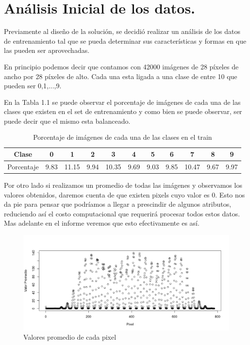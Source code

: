 \chapter{Análisis Inicial de los datos.}
Previamente al diseño de la solución, se decidió realizar un análisis de los datos de entrenamiento tal que se pueda determinar sus características y formas en que las pueden ser aprovechadas.

En principio podemos decir que contamos con 42000 imágenes de 28 píxeles de ancho por 28 píxeles de alto. Cada una esta ligada a una clase de entre 10 que pueden ser 0,1,...,9. 

En la Tabla 1.1 se puede observar el porcentaje de imágenes de cada una de las clases que existen en el set de entrenamiento y como bien se puede observar, ser puede decir que el mismo esta balanceado. 

\begin{table}[htp]
  \caption{Porcentaje de imágenes de cada una de las clases en el train}
  \label{porc}

  \begin{center}
    \begin{tabular}{|c|c|c|c|c|c|c|c|c|c|c|}
    \hline
      Clase&0&1&2&3&4&5&6&7&8&9 \\
    \hline
      Porcentaje&9.83&11.15&9.94&10.35&9.69&9.03&9.85&10.47&9.67&9.97 \\
    \hline
    \end{tabular}
  \end{center}
\end{table}

Por otro lado si realizamos un promedio de todas las imágenes y observamos los valores obtenidos, daremos cuenta de que existen pixels cuyo valor es 0. Esto nos da pie para pensar que podríamos a llegar a prescindir de algunos atributos, reduciendo así el costo computacional que requerirá procesar todos estos datos. Mas adelante en el informe veremos que esto efectivamente es así.
\begin{figure}[htp]
  \begin{center}
    \includegraphics[width=15cm]{promImg.jpeg}
    \caption{Valores promedio de cada pixel}
    \label{promPix}
  \end{center}
\end{figure}

